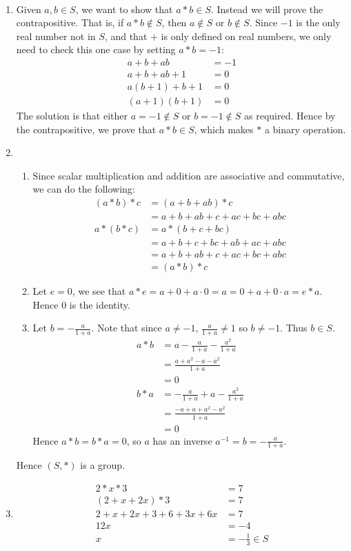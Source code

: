 \documentclass[12pt]{article}
\begin{document}
\begin{problem}[4.19]
~\begin{enumerate}[label=\alph*)]
	\item Given $a,b \in S$, we want to show that $a*b \in S$. Instead we will prove the contrapositive. That is, if $a*b \not \in S$, then  $a \not \in S$ or  $b \not \in S$. Since  $-1$ is the only real number not in $S$, and that $+$ is only defined on real numbers, we only need to check this one case by setting  $a*b = -1$:
		 \begin{align*}
			 a+b+ab &= -1\\
			 a+b+ab+1 &= 0 \\
			 a(b+1)+b+1 &= 0 \\
			 (a+1)(b+1) &= 0
		\end{align*}
	The solution is that either $a = -1 \not \in S$ or  $b=-1 \not \in S$ as required. Hence by the contrapositive, we prove that  $a*b \in S$, which makes $*$ a binary operation. 
\item 
	~\begin{enumerate}[label=(\roman*)]
		\item Since scalar multiplication and addition are associative and commutative, we can do the following:
			\begin{align*}
				(a*b)*c&=(a+b+ab)*c\\
				&= a+b+ab+c+ac+bc+abc \\
				a*(b*c) &= a*(b+c+bc) \\
				&= a+b + c+bc+ab+ac+abc \\
				&= a+b+ab+c+ac+bc+abc \\
				&= (a*b)*c 
			\end{align*}
		\item Let $e=0$, we see that  $a*e=a+0+a\cdot 0=a = 0+a+0\cdot a= e*a$. Hence $0$ is the identity.
		\item Let  $b = -\frac{a}{1+a}$. Note that since $a \neq -1$,  $\frac{a}{1+a} \neq 1$ so $b \neq -1$. Thus  $b \in S$.
			\begin{align*}
				a*b &= a- \frac{a}{1+a}-\frac{a^2}{1+a} \\
				&= \frac{a+a^2-a-a^2}{1+a} \\
				&= 0 \\
b*a &= -\frac{a}{1+a} + a -\frac{a^2}{1+a} \\
&= \frac{-a+a+a^2-a^2}{1+a} \\
&= 0
			\end{align*}
	Hence $a*b=b*a=0$, so $a$ has an inverse $a^{-1}=b=-\frac{a}{1+a}$.
	\end{enumerate}
	Hence $(S,*)$ is a group.
\item 
	\begin{align*}
		2*x*3&= 7 \\
		(2+x+2x)*3 &= 7 \\
		2+x+2x+3+6+3x+6x &= 7 \\
		12x&= -4 \\
		x&= -\frac{1}{3} \in S
	\end{align*}
\end{enumerate}
\end{problem}
\end{document}
